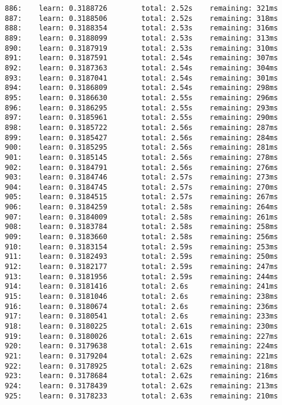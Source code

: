 \documentclass[11pt]{article}
\begin{document}
\begin{Verbatim}[commandchars=\\\{\}]
886:    learn: 0.3188726        total: 2.52s    remaining: 321ms
887:    learn: 0.3188506        total: 2.52s    remaining: 318ms
888:    learn: 0.3188354        total: 2.53s    remaining: 316ms
889:    learn: 0.3188099        total: 2.53s    remaining: 313ms
890:    learn: 0.3187919        total: 2.53s    remaining: 310ms
891:    learn: 0.3187591        total: 2.54s    remaining: 307ms
892:    learn: 0.3187363        total: 2.54s    remaining: 304ms
893:    learn: 0.3187041        total: 2.54s    remaining: 301ms
894:    learn: 0.3186809        total: 2.54s    remaining: 298ms
895:    learn: 0.3186630        total: 2.55s    remaining: 296ms
896:    learn: 0.3186295        total: 2.55s    remaining: 293ms
897:    learn: 0.3185961        total: 2.55s    remaining: 290ms
898:    learn: 0.3185722        total: 2.56s    remaining: 287ms
899:    learn: 0.3185427        total: 2.56s    remaining: 284ms
900:    learn: 0.3185295        total: 2.56s    remaining: 281ms
901:    learn: 0.3185145        total: 2.56s    remaining: 278ms
902:    learn: 0.3184791        total: 2.56s    remaining: 276ms
903:    learn: 0.3184746        total: 2.57s    remaining: 273ms
904:    learn: 0.3184745        total: 2.57s    remaining: 270ms
905:    learn: 0.3184515        total: 2.57s    remaining: 267ms
906:    learn: 0.3184259        total: 2.58s    remaining: 264ms
907:    learn: 0.3184009        total: 2.58s    remaining: 261ms
908:    learn: 0.3183784        total: 2.58s    remaining: 258ms
909:    learn: 0.3183660        total: 2.58s    remaining: 256ms
910:    learn: 0.3183154        total: 2.59s    remaining: 253ms
911:    learn: 0.3182493        total: 2.59s    remaining: 250ms
912:    learn: 0.3182177        total: 2.59s    remaining: 247ms
913:    learn: 0.3181956        total: 2.59s    remaining: 244ms
914:    learn: 0.3181416        total: 2.6s     remaining: 241ms
915:    learn: 0.3181046        total: 2.6s     remaining: 238ms
916:    learn: 0.3180674        total: 2.6s     remaining: 236ms
917:    learn: 0.3180541        total: 2.6s     remaining: 233ms
918:    learn: 0.3180225        total: 2.61s    remaining: 230ms
919:    learn: 0.3180026        total: 2.61s    remaining: 227ms
920:    learn: 0.3179638        total: 2.61s    remaining: 224ms
921:    learn: 0.3179204        total: 2.62s    remaining: 221ms
922:    learn: 0.3178925        total: 2.62s    remaining: 218ms
923:    learn: 0.3178684        total: 2.62s    remaining: 216ms
924:    learn: 0.3178439        total: 2.62s    remaining: 213ms
925:    learn: 0.3178233        total: 2.63s    remaining: 210ms

\end{Verbatim}
\end{document}
